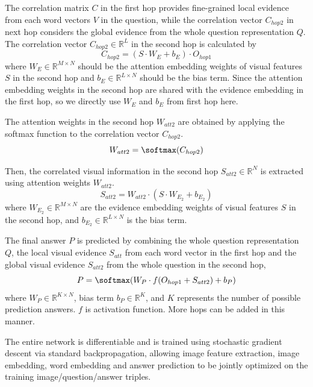 The correlation matrix $C$ in the first hop provides fine-grained local evidence from each word vectors $V$ in the question, while the correlation vector $C_{hop2}$ in next hop considers the global evidence from the whole question representation $Q$. 
The correlation vector $C_{hop2} \in \mathbb{R}^L$ in the second hop is calculated by 
\begin{equation}
C_{hop2} = (S \cdot W_E + b_E) \cdot O_{hop1}
\end{equation}
where $W_E \in \mathbb{R}^{M\times N}$ should be the attention embedding weights of visual features $S$ in the second hop and $b_E \in \mathbb{R}^{L\times N}$ should be the bias term. Since the attention embedding weights in the second hop are shared with the evidence embedding in the first hop, so we directly use $W_E$ and $b_E$ from first hop here. 

The attention weights in the second hop $W_{att2}$ are obtained by applying the softmax function to the correlation vector $C_{hop2}$.
\begin{equation}
W_{att2} = \softmax(C_{hop2})
\end{equation}

Then, the correlated visual information in the second hop $S_{att2} \in \mathbb{R}^N$ is extracted using attention weights $W_{att2}$.
\begin{equation}
S_{att2} = W_{att2} \cdot (S \cdot W_{E_2} + b_{E_2})
\end{equation}
where $W_{E_2} \in \mathbb{R}^{M\times N}$ are the evidence embedding weights of visual features $S$ in the second hop, and $b_{E_2} \in \mathbb{R}^{L\times N}$ is the bias term. 

The final answer $P$ is predicted by combining the whole question representation $Q$, the local visual evidence $S_{att}$ from each word vector in the first hop and the global visual evidence $S_{att2}$ from the whole question in the second hop,
\begin{equation}
P = \softmax(W_P \cdot f(O_{hop1} + S_{att2}) + b_P)
\end{equation}
where $W_P \in \mathbb{R}^{K\times N}$, bias term $b_P \in \mathbb{R}^{K}$, and $K$ represents the number of possible prediction answers. $f$ is activation function. More hops can be added in this manner. 

The entire network is differentiable and is trained using stochastic gradient descent via standard backpropagation, allowing image feature extraction, image embedding, word embedding and answer prediction to be  jointly optimized on the training image/question/answer triples. 